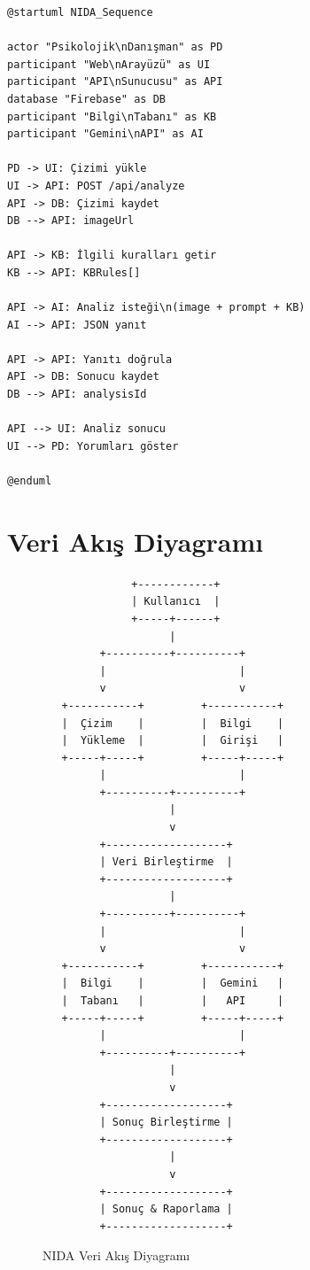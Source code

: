 \begin{tcolorbox}[colback=gray!5, colframe=gray!75, title=Süreç Diyagramı (PlantUML), breakable]
\begin{verbatim}
@startuml NIDA_Sequence

actor "Psikolojik\nDanışman" as PD
participant "Web\nArayüzü" as UI
participant "API\nSunucusu" as API
database "Firebase" as DB
participant "Bilgi\nTabanı" as KB
participant "Gemini\nAPI" as AI

PD -> UI: Çizimi yükle
UI -> API: POST /api/analyze
API -> DB: Çizimi kaydet
DB --> API: imageUrl

API -> KB: İlgili kuralları getir
KB --> API: KBRules[]

API -> AI: Analiz isteği\n(image + prompt + KB)
AI --> API: JSON yanıt

API -> API: Yanıtı doğrula
API -> DB: Sonucu kaydet
DB --> API: analysisId

API --> UI: Analiz sonucu
UI --> PD: Yorumları göster

@enduml
\end{verbatim}
\end{tcolorbox}

\section{Veri Akış Diyagramı}

\begin{figure}[h!]
\centering
\begin{tcolorbox}[colback=gray!5, colframe=gray!75, width=0.85\textwidth]
{\small
\begin{verbatim}
              +------------+
              | Kullanıcı  |
              +-----+------+
                    |
         +----------+----------+
         |                     |
         v                     v
   +-----------+         +-----------+
   |  Çizim    |         |  Bilgi    |
   |  Yükleme  |         |  Girişi   |
   +-----+-----+         +-----+-----+
         |                     |
         +----------+----------+
                    |
                    v
         +-------------------+
         | Veri Birleştirme  |
         +-------------------+
                    |
         +----------+----------+
         |                     |
         v                     v
   +-----------+         +-----------+
   |  Bilgi    |         |  Gemini   |
   |  Tabanı   |         |   API     |
   +-----+-----+         +-----+-----+
         |                     |
         +----------+----------+
                    |
                    v
         +-------------------+
         | Sonuç Birleştirme |
         +-------------------+
                    |
                    v
         +-------------------+
         | Sonuç & Raporlama |
         +-------------------+
\end{verbatim}
}
\end{tcolorbox}
\caption{NIDA Veri Akış Diyagramı}
\label{fig:dfd}
\end{figure}

